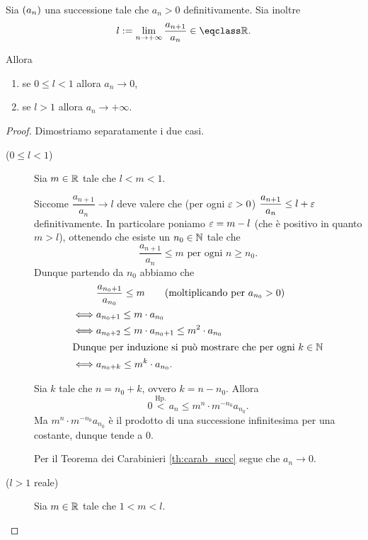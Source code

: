 \begin{proposition}
     \label{prop:crit_rapporto_succ}
    Sia $\seqn*{a}$ una successione tale che $a_n > 0$ definitivamente. Sia inoltre \[
        l \deq \lim_{n \to +\infty} \frac{a_{n+1}}{a_n} \in \closure{\R}.    
    \]

    Allora \begin{enumerate}[label={(\roman*)}, ref={criterio del rapporto (\theproposition): (\roman*)}]
        \item se $0 \leq l < 1$ allora $a_n \to 0$,
        \item se $l > 1$ allora $a_n \to +\infty$.
    \end{enumerate}
\end{proposition}
\begin{proof}
    Dimostriamo separatamente i due casi.
    \begin{description}
        \item[($0 \leq l < 1$)] Sia $m \in \mathbb{R}$ tale che $l < m < 1$.
        
        Siccome $\dfrac{a_{n+1}}{a_n} \to l$ deve valere che (per ogni $\varepsilon > 0$) $\dfrac{a_{n+1}}{a_n} \leq l + \varepsilon$ definitivamente. In particolare poniamo $\varepsilon = m - l$ (che è positivo in quanto $m > l$), ottenendo che esiste un $n_0 \in \mathbb{N}$ tale che \[
            \frac{a_{n+1}}{a_n} \leq m \text{    per ogni } n \geq n_0.
        \]
        Dunque partendo da $n_0$ abbiamo che \begin{align*}
            &\frac{a_{n_0+1}}{a_{n_0}} \leq m \tag{moltiplicando per $a_{n_0} > 0$}\\
            \iff &a_{n_0+1} \leq m \cdot a_{n_0}\\
            \iff &a_{n_0+2} \leq m \cdot a_{n_0 + 1} \leq m^2 \cdot a_{n_0}\\
            \intertext{Dunque per induzione si può mostrare che per ogni $k \in \N$}
            \iff &a_{n_0+k} \leq m^k \cdot a_{n_0}.
        \end{align*}

        Sia $k$ tale che $n = n_0 + k$, ovvero $k = n - n_0$. Allora \[
            0 \stackrel{\text{Hp.}}{<} a_n \leq m^n \cdot m^{-n_0}a_{n_0}. 
        \] Ma $m^n \cdot m^{-n_0}a_{n_0}$ è il prodotto di una successione infinitesima per una costante, dunque tende a $0$.

        Per il Teorema dei Carabinieri \ref{th:carab_succ} segue che $a_n \to 0$.
        \item[($l > 1$ reale)] Sia $m \in \mathbb{R}$ tale che $1 < m < l$.
        

\end{description}
\end{proof}
